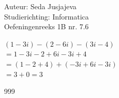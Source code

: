 \documentclass[a4paper]{article}
\begin{document}
\noindent \large Auteur: Seda Jusjajeva\\
\noindent \large Studierichting: Informatica\\
\noindent \large Oefeningenreeks 1B nr. 7.6\\

\medskip

\normalsize

$( 1 - 3i) - (2 - 6i) - (3i - 4)$ \\

$= 1 - 3i - 2 + 6i - 3i + 4$ \\

$= (1 - 2 + 4) + (-3i + 6i - 3i)$ \\

$= 3 + 0 = 3$ \\



\begin{thebibliography}{999}
\end{thebibliography}
\end{document}
